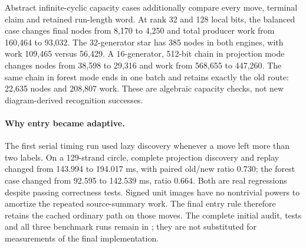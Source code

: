 Abstract infinite-cyclic capacity cases additionally compare every move,
terminal claim and retained run-length word. At rank 32 and 128 local bits,
the balanced case changes final nodes from 8,170 to 4,250 and total producer
work from 160,464 to 93,032. The 32-generator star has 385 nodes in both
engines, with work 109,465 versus 56,429. A 16-generator, 512-bit chain in
projection mode changes nodes from 38,598 to 29,316 and work from 568,655
to 447,260. The same chain in forest mode ends in one batch and retains
exactly the old route: 22,635 nodes and 208,807 work. These are algebraic
capacity checks, not new diagram-derived recognition successes.

\paragraph{Why entry became adaptive.}
The first serial timing run used lazy discovery whenever a move left more
than two labels. On a 129-strand circle, complete projection discovery and
replay changed from 143.994 to 194.017 ms, with paired old/new ratio $0.730$;
the forest case changed from 92.595 to 142.539 ms, ratio $0.664$. Both are
real regressions despite passing correctness tests. Signed unit images have
no nontrivial powers to amortize the repeated source-summary work. The final
entry rule therefore retains the cached ordinary path on those moves.
The complete initial audit, tests and all three benchmark runs remain in
; they are not substituted for
measurements of the final implementation.



